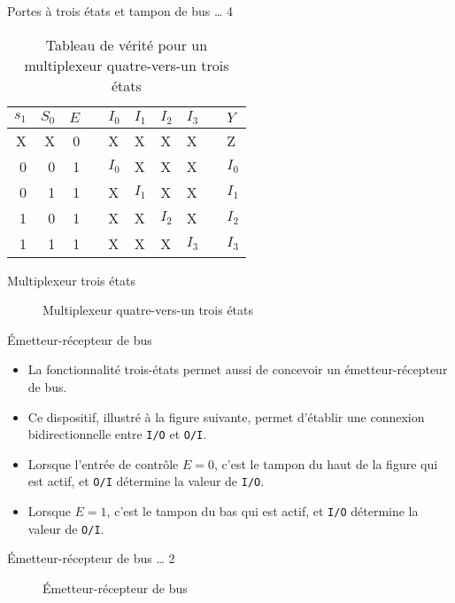 \documentclass[presentation]{beamer}
\begin{document}
\begin{frame}[label={sec:orgb551a91}]{Portes à trois états et tampon de bus \ldots{} 4}
\begin{table}[htbp]
\caption{\label{tab:org3a594dd}Tableau de vérité pour un  multiplexeur quatre-vers-un trois états}
\centering
\begin{tabular}{rrrlllllll}
\(s_1\) & \(S_0\) & \(E\) &  & \(I_0\) & \(I_1\) & \(I_2\) & \(I_3\) &  & \(Y\)\\[0pt]
\hline
X & X & 0 &  & X & X & X & X &  & Z\\[0pt]
0 & 0 & 1 &  & \(I_0\) & X & X & X &  & \(I_0\)\\[0pt]
0 & 1 & 1 &  & X & \(I_1\) & X & X &  & \(I_1\)\\[0pt]
1 & 0 & 1 &  & X & X & \(I_2\) & X &  & \(I_2\)\\[0pt]
1 & 1 & 1 &  & X & X & X & \(I_3\) &  & \(I_3\)\\[0pt]
\end{tabular}
\end{table}
\end{frame}

\begin{frame}[label={sec:orge462d7a}]{Multiplexeur trois états}
\begin{figure}[htbp]
\centering

\caption{\label{fig:org417242c}Multiplexeur quatre-vers-un trois états}
\end{figure}
\end{frame}


\begin{frame}[label={sec:org6064841},fragile]{Émetteur-récepteur de bus}
 \begin{itemize}
\item La fonctionnalité trois-états permet aussi de concevoir un émetteur-récepteur de bus.

\item Ce dispositif, illustré à la figure suivante, permet d'établir une connexion bidirectionnelle entre \texttt{I/O} et \texttt{O/I}.

\item Lorsque l'entrée de contrôle \(E = 0\), c'est le tampon du haut de la figure qui est actif, et \texttt{O/I} détermine la valeur de \texttt{I/O}.

\item Lorsque \(E = 1\), c'est le tampon du bas qui est actif, et \texttt{I/O} détermine la valeur de \texttt{O/I}.
\end{itemize}
\end{frame}

\begin{frame}[label={sec:org7a40166}]{Émetteur-récepteur de bus \ldots{} 2}
\begin{figure}[htbp]
\centering

\caption{\label{fig:org84583cc}Émetteur-récepteur de bus}
\end{figure}
\end{frame}
\end{document}
